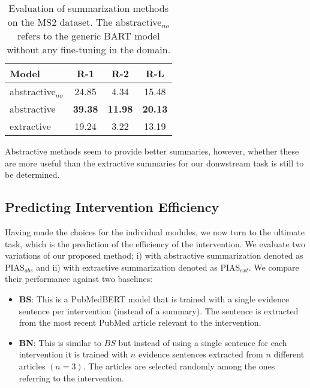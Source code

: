 \documentclass[11pt]{article}
\begin{document}
\begin{table}[htp]
\centering
\begin{tabular}{lccc}
\hline
\textbf{Model} &\textbf{R-1} & \textbf{R-2} & \textbf{R-L}\\
\hline

abstractive$_{no}$ & 24.85 & 4.34 & 15.48\\ 

abstractive & \textbf{39.38} & \textbf{11.98} & \textbf{20.13}\\ 

extractive & 19.24 & 3.22 & 13.19\\ 
\hline

\hline
\end{tabular}

\caption{Evaluation of summarization methods on the MS2 dataset. The abstractive$_{no}$ refers to the generic BART model without any fine-tuning in the domain.}
\label{tab:sum_a}
\end{table}

Abstractive methods seem to provide better summaries, however, whether these are more useful than the extractive summaries for our donwstream task is still to be determined. 





\subsection{Predicting Intervention Efficiency}

Having made the choices for the individual modules, we now turn to the ultimate task, which is the prediction of the efficiency of the intervention. We evaluate two variations of our proposed method; i) with abstractive summarization denoted as PIAS$_{abs}$ and ii)  with extractive summarization denoted as PIAS$_{ext}$. We compare their performance against two baselines:

\begin{itemize}
    \item \textbf{BS}: This is a PubMedBERT model that is trained with a single evidence sentence per intervention (instead of a summary). The sentence is extracted from the most recent PubMed article relevant to the intervention.
    \item \textbf{BN}: This is similar to $BS$ but instead of using a single sentence for each intervention it is trained with $n$ evidence sentences extracted from $n$ different articles $(n=3)$.  The articles are selected randomly among the ones referring to the intervention.

\end{itemize}
\end{document}
